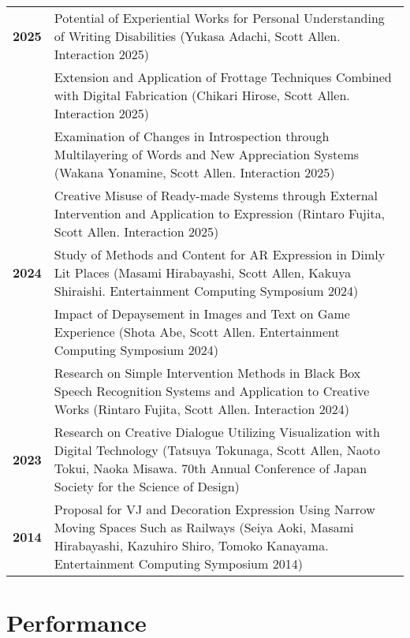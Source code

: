 \documentclass[8pt,a4paper]{article}
\begin{document}
\begin{tabular}{@{}p{1.2cm}@{\hspace{0.5cm}}p{14cm}@{}}
\textbf{2025} & Potential of Experiential Works for Personal Understanding of Writing Disabilities (Yukasa Adachi, Scott Allen. Interaction 2025) \\
& Extension and Application of Frottage Techniques Combined with Digital Fabrication (Chikari Hirose, Scott Allen. Interaction 2025) \\
& Examination of Changes in Introspection through Multilayering of Words and New Appreciation Systems (Wakana Yonamine, Scott Allen. Interaction 2025) \\
& Creative Misuse of Ready-made Systems through External Intervention and Application to Expression (Rintaro Fujita, Scott Allen. Interaction 2025) \\[0.2em]
\textbf{2024} & Study of Methods and Content for AR Expression in Dimly Lit Places (Masami Hirabayashi, Scott Allen, Kakuya Shiraishi. Entertainment Computing Symposium 2024) \\
& Impact of Depaysement in Images and Text on Game Experience (Shota Abe, Scott Allen. Entertainment Computing Symposium 2024) \\
& Research on Simple Intervention Methods in Black Box Speech Recognition Systems and Application to Creative Works (Rintaro Fujita, Scott Allen. Interaction 2024) \\[0.2em]
\textbf{2023} & Research on Creative Dialogue Utilizing Visualization with Digital Technology (Tatsuya Tokunaga, Scott Allen, Naoto Tokui, Naoka Misawa. 70th Annual Conference of Japan Society for the Science of Design) \\[0.2em]
\textbf{2014} & Proposal for VJ and Decoration Expression Using Narrow Moving Spaces Such as Railways (Seiya Aoki, Masami Hirabayashi, Kazuhiro Shiro, Tomoko Kanayama. Entertainment Computing Symposium 2014) \\
\end{tabular}

\section*{Performance}
\end{document}
